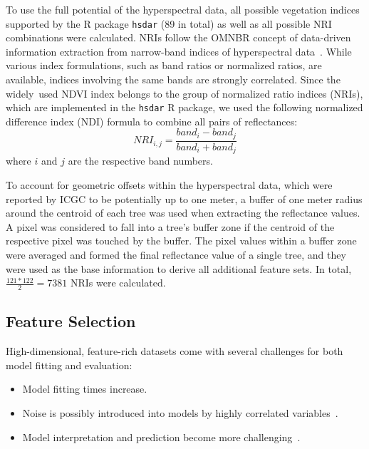 \documentclass[remotesensing,article,accept,moreauthors,pdftex]{Definitions/mdpi}
\begin{document}
\begin{paracol}{2}
To use the full potential of the hyperspectral data, all possible vegetation indices supported by the R package \texttt{hsdar} (89 in total) as well as all possible \ac{NRI} combinations were calculated.
NRIs follow the \ac{OMNBR} concept of data-driven information extraction from narrow-band indices of hyperspectral data~\cite{thenkabail2000,thenkabail2018}.
While various index formulations, such as band ratios or normalized ratios, are available, indices involving the same bands are strongly correlated.
Since the widely\ used NDVI index belongs to the group of normalized ratio indices (NRIs), which are implemented in the \texttt{hsdar} R package, we used the following normalized difference index (NDI) formula to combine all pairs of reflectances:
\begin{equation}
	NRI_{i,j} = \frac{band_{i} - band_{j}}{band_{i} + band_{j}}
\end{equation}
where \(i\) and \(j\) are the respective band numbers.


To account for geometric offsets within the hyperspectral data, which were reported by \ac{ICGC} to be potentially up to one meter, a buffer of one meter radius around the centroid of each tree was used when extracting the reflectance values.
A pixel was considered to fall into a tree's buffer zone if the centroid of the respective pixel was touched by the buffer.
The pixel values within a buffer zone were averaged and formed the final reflectance value of a single tree, and they were used as the base information to derive all additional feature sets.
In total, \(\frac{121*122}{2} = 7381\) NRIs were calculated.

\subsection{Feature Selection}

High-dimensional, feature-rich datasets come with several challenges for both model fitting and evaluation:

\begin{itemize}
	\item Model fitting times increase.
	\item Noise is possibly introduced into models by highly correlated variables~\cite{johnstoneiainm.2009}.
	\item Model interpretation and prediction become more challenging~\cite{johnstoneiainm.2009}.
\end{itemize}


\end{paracol}
\end{document}
